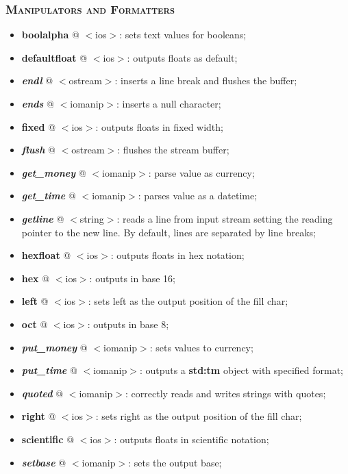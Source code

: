 \documentclass[10pt]{article}
\begin{document}
\begin{multicols*}{5}
{\subsubsection*{\textsc{Manipulators and Formatters}} 
\begin{itemize}[leftmargin=*,topsep=0.25pt]
  \setlength\itemsep{-1.8pt}
	\item \textbf{boolalpha} @ $<$ios$>$: sets text values for booleans;
	\item \textbf{defaultfloat} @ $<$ios$>$: outputs floats as default;
	\item \emph{\textbf{endl}} @ $<$ostream$>$: inserts a line break and flushes the buffer; 
	\item \emph{\textbf{ends}} @ $<$iomanip$>$: inserts a null character; 
	\item \textbf{fixed} @ $<$ios$>$: outputs floats in fixed width;
	\item \emph{\textbf{flush}} @ $<$ostream$>$: flushes the stream buffer; 
	\item \emph{\textbf{get\_money}} @ $<$iomanip$>$: parse value as currency; 
	\item \emph{\textbf{get\_time}} @ $<$iomanip$>$: parses value as a datetime; 
	\item \emph{\textbf{getline}} @ $<$string$>$:  reads a line from input stream setting the reading pointer to the new line. By default, lines are separated by line breaks;
	\item \textbf{hexfloat} @ $<$ios$>$: outputs floats in hex notation;
	\item \textbf{hex} @ $<$ios$>$: outputs in base 16;
	\item \textbf{left} @ $<$ios$>$: sets left as the output position of the fill char;
	\item \textbf{oct} @ $<$ios$>$: outputs in base 8;
	\item \emph{\textbf{put\_money}} @ $<$iomanip$>$: sets values to currency; 
	\item \emph{\textbf{put\_time}} @ $<$iomanip$>$: outputs a \textbf{std:tm} object with specified format; 
	\item \emph{\textbf{quoted}} @ $<$iomanip$>$: correctly reads and writes strings with quotes; 
	\item \textbf{right} @ $<$ios$>$: sets right as the output position of the fill char;
	\item \textbf{scientific} @ $<$ios$>$: outputs floats in scientific notation;
	\item \emph{\textbf{setbase}} @ $<$iomanip$>$: sets the output base; 

\end{itemize}}
\end{multicols*}
\end{document}
